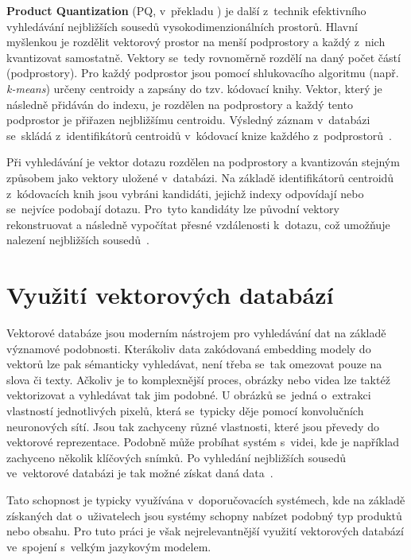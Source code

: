 \textbf{Product Quantization} (PQ, v~překladu ) je další z~technik efektivního vyhledávání nejbližších sousedů vysokodimenzionálních prostorů. Hlavní myšlenkou je rozdělit vektorový prostor na menší podprostory a každý z~nich kvantizovat samostatně. Vektory se~tedy rovnoměrně rozdělí na daný počet částí (podprostory). Pro každý podprostor jsou pomocí shlukovacího algoritmu (např. \textit{k-means}) určeny centroidy a zapsány do tzv. kódovací knihy. Vektor, který je následně přidáván do indexu, je rozdělen na podprostory a každý tento podprostor je přiřazen nejbližšímu centroidu. Výsledný záznam v~databázi se~skládá z~identifikátorů centroidů v~kódovací knize každého z~podprostorů~\cite{jegou2011_product_quantization}.

Při vyhledávání je vektor dotazu rozdělen na podprostory a kvantizován stejným způsobem jako vektory uložené v~databázi. Na základě identifikátorů centroidů z~kódovacích knih jsou vybráni kandidáti, jejichž indexy odpovídají nebo se~nejvíce podobají dotazu. Pro~tyto kandidáty lze původní vektory rekonstruovat a následně vypočítat přesné vzdálenosti k~dotazu, což umožňuje nalezení nejbližších sousedů~\cite{jegou2011_product_quantization}.

\section{Využití vektorových databází}
Vektorové databáze jsou moderním nástrojem pro vyhledávání dat na základě významové podobnosti. Kterákoliv data zakódovaná embedding modely do vektorů lze pak sémanticky vyhledávat, není třeba se~tak omezovat pouze na slova či texty. Ačkoliv je to komplexnější proces, obrázky nebo videa lze taktéž vektorizovat a vyhledávat tak jim podobné. U obrázků se~jedná o~extrakci vlastností jednotlivých pixelů, která se~typicky děje pomocí konvolučních neuronových sítí. Jsou tak zachyceny různé vlastnosti, které jsou převedy do vektorové reprezentace. Podobně může probíhat systém s~videi, kde je například zachyceno několik klíčových snímků. Po vyhledání nejbližších sousedů ve~vektorové databázi je tak možné získat daná data~\cite{Taipalus_2024}.

Tato schopnost je typicky využívána v~doporučovacích systémech, kde na základě získaných dat o~uživatelech jsou systémy schopny nabízet podobný typ produktů nebo obsahu. Pro tuto práci je však nejrelevantnější využití vektorových databází ve~spojení s~velkým jazykovým modelem. 

